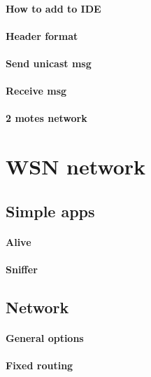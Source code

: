 \documentclass[12pt,titlepage]{article}
\begin{document}
		\paragraph{How to add to IDE}
		\paragraph{Header format}
		\paragraph{Send unicast msg}
		\paragraph{Receive msg}
		\paragraph{2 motes network}

\section{WSN network}
	\subsection{Simple apps}
		\paragraph{Alive}
		\paragraph{Sniffer}

	\subsection{Network}
		\paragraph{General options}
		\paragraph{Fixed routing}
\end{document}
